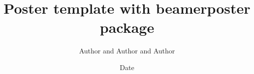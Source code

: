 \documentclass[compress]{beamer}
\title[Poster Template]{Poster template with beamerposter package}
\author[Authors]{Author and Author and Author}
\institute[NArFU]{Northern (Arctic) Federal University}
\date{Date}
\begin{document}
\begin{frame}{}

\begin{beamercolorbox}{}
\maketitle
\end{beamercolorbox}



\end{frame}
\end{document}
